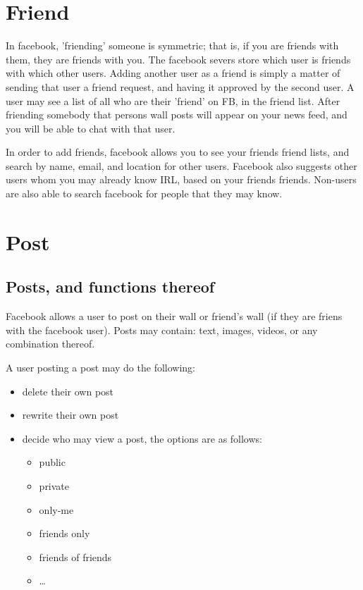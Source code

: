 \section{Friend}
In facebook, 'friending' someone is symmetric; that is, if you are friends with
them, they are friends with you. The facebook severs store which user is friends
with which other users. Adding another user as a friend is simply a matter of
sending that user a friend request, and having it approved by the second user. A
user may see a list of all who are their 'friend' on FB, in the friend list.
After friending somebody that persons wall posts will appear on your news feed,
and you will be able to chat with that user.

In order to add friends, facebook allows you to see your friends friend lists,
and search by name, email, and location for other users. Facebook also suggests
other users whom you may already know IRL, based on your friends friends.
Non-users are also able to search facebook for people that they may know.

\section{Post}
\subsection{Posts, and functions thereof}
Facebook allows a user to post on their wall or friend's wall (if they are
friens with the facebook user). Posts may contain: text, images, videos, or any
combination thereof.

A user posting a post may do the following:
\begin{itemize}
\item delete their own post
\item rewrite their own post
\item decide who may view a post, the options are as follows:
    \begin{itemize}
    \item public
    \item private
    \item only-me
    \item friends only
    \item friends of friends
    \item \ldots {}
    \end{itemize}
\end{itemize}

